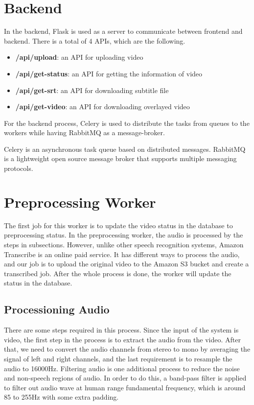 \documentclass[natbib]{muthesis}
\begin{document}
 \section{Backend}
 In the backend, Flask is used as a server to communicate between frontend and backend. There is a total of 4 APIs, which are the following.
 \begin{itemize}
 	\setlength\itemsep{0em}
 	\item \textbf{/api/upload}: an API for uploading video
 	\item \textbf{/api/get-status}: an API for getting the information of video
 	\item \textbf{/api/get-srt}: an API for downloading subtitle file
 	\item \textbf{/api/get-video}: an API for downloading overlayed video
 \end{itemize}
 
 For the backend process, Celery is used to distribute the tasks from queues to the workers while having RabbitMQ as a message-broker. 
 
 Celery is an asynchronous task queue based on distributed messages.\cite{CeleryProj}
 RabbitMQ is a lightweight open source message broker that supports multiple messaging protocols.\cite{Rabbit}
 
 \section{Preprocessing Worker}
 The first job for this worker is to update the video status in the database to preprocessing status.
 In the preprocessing worker, the audio is processed by the steps in subsections. 
 However, unlike other speech recognition systems, Amazon Transcribe is an online paid service. It has different ways to process the audio, and our job is to upload the original video to the Amazon S3 bucket and create a transcribed job. After the whole process is done, the worker will update the status in the database.
 
 \subsection{Processioning Audio}
 There are some steps required in this process. Since the input of the system is video, the first step in the process is to extract the audio from the video. After that, we need to convert the audio channels from stereo to mono by averaging the signal of left and right channels, and the last requirement is to resample the audio to 16000Hz.
 Filtering audio is one additional process to reduce the noise and non-speech regions of audio. In order to do this, a band-pass filter is applied to filter out audio wave at human range fundamental frequency, which is around 85 to 255Hz with some extra padding\cite{nagaraja2019voiploc}.
 
\end{document}
